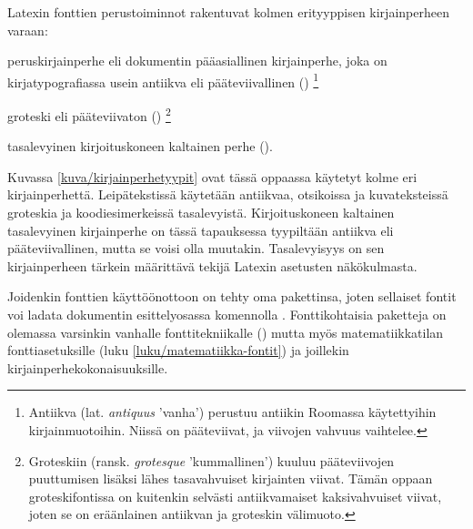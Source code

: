 Latexin fonttien perustoiminnot rakentuvat kolmen erityyppisen
kirjainperheen varaan:

\begin{nluetelma}
\item peruskirjainperhe eli dokumentin pääasiallinen kirjainperhe, joka
  on kirjatypografiassa usein antiikva eli pääteviivallinen
  ()%
  \footnote{Antiikva (lat. \emph{antiquus} 'vanha') perustuu antiikin
    Roomassa käytettyihin kirjainmuotoihin. Niissä on pääteviivat, ja
    viivojen vahvuus vaihtelee.}
\item groteski eli pääteviivaton ()%
  \footnote{Groteskiin (ransk. \emph{grotesque} 'kummallinen') kuuluu
    pääteviivojen puuttumisen lisäksi lähes tasavahvuiset kirjainten
    viivat. Tämän oppaan groteskifontissa on kuitenkin selvästi
    antiikvamaiset kaksivahvuiset viivat, joten se on eräänlainen
    antiikvan ja groteskin välimuoto.}
\item tasalevyinen kirjoituskoneen kaltainen perhe
  ().
\end{nluetelma}

\noindent
Kuvassa \ref{kuva/kirjainperhetyypit} ovat tässä oppaassa käytetyt kolme
eri kirjainperhettä. Leipätekstissä käytetään antiikvaa, otsikoissa ja
kuvateksteissä groteskia ja koodiesimerkeissä tasalevyistä.
Kirjoituskoneen kaltainen tasalevyinen kirjainperhe on tässä tapauksessa
tyypiltään antiikva eli pääteviivallinen, mutta se voisi olla muutakin.
Tasalevyisyys on sen kirjainperheen tärkein määrittävä tekijä Latexin
asetusten näkökulmasta.


Joidenkin fonttien käyttöönottoon on tehty oma pakettinsa, joten
sellaiset fontit voi ladata dokumentin esittelyosassa komennolla
. Fonttikohtaisia paketteja on olemassa
varsinkin vanhalle fonttitekniikalle () mutta myös matematiikkatilan fonttiasetuksille (luku
\ref{luku/matematiikka-fontit}) ja joillekin
kir\-jain\-perhe\-koko\-nai\-suuk\-sille.

